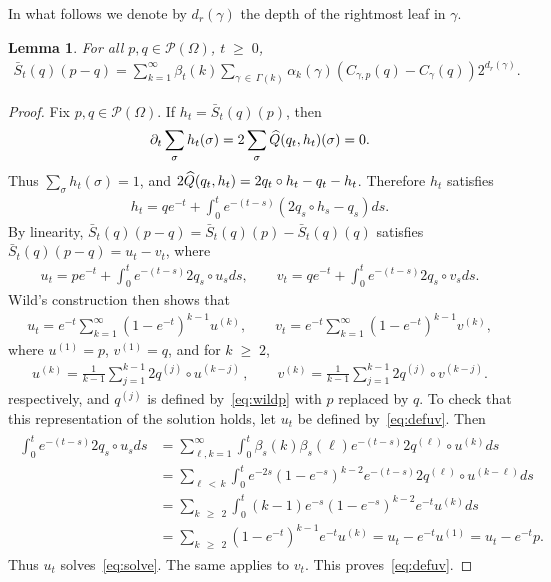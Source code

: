 \documentclass[10pt,a4paper]{article}
\newtheorem{lemm}[theorem]{Lemma}
\renewcommand{\geq}{\;\geqslant\;}
\newcommand{\si}{\sigma}
\newcommand{\cP}{\mathcal{P}}
\let\b=\beta
\let\g=\gamma
\let\O=\Omega
\let\oldhat\hat
\renewcommand*{\hat}[1]{\mathchoice{\widehat{#1}}{\widehat{#1}}{\oldhat{#1}}{\oldhat{#1}}}
\begin{document}
In what follows we denote by $d_r(\g)$ the depth of the rightmost leaf in $\g$.

\begin{lemm}\label{lem:wildrep}
For all $p,q \in \cP(\O)$, $t\geq 0$,
\begin{align}\label{eq:topid}
\bar{S}_t(q)(p-q) = \sum_{k=1}^\infty\b_t(k) \sum_{\gamma\,\in\,\Gamma(k)}\alpha_k(\gamma)\left(C_{\gamma, p}(q)-C_{\gamma}(q)\right)2^{d_r(\gamma)}.
\end{align}
\end{lemm}

\begin{proof}
Fix $p,q \in \cP(\O)$. If $h_t=\bar{S}_t(q)(p)$, then
\begin{align*}
\partial_t \sum_{\sigma}h_t(\sigma) = 2\sum_{\sigma}\hat{Q}(q_t,h_t)(\si) = 0.
\end{align*}
Thus $ \sum_{\sigma}h_t(\sigma) = 1$, and $2\hat{Q}(q_t,h_{t})=2q_t \circ h_{t} - q_t - h_{t}$. Therefore $h_t$ satisfies
\begin{align}
h_t = qe^{-t} + \int_{0}^te^{-(t-s)}\left(2q_{s} \circ h_{s}-q_{s}\right)ds.
\end{align}
By linearity, $ \bar{S}_t(q)(p-q) =\bar{S}_t(q)(p) - \bar{S}_t(q)(q)$ satisfies $\bar{S}_t(q)(p-q) =u_t-v_t$, where
\begin{align}\label{eq:solve}
u_t = pe^{-t} + \int_{0}^te^{-(t-s)}2q_{s} \circ u_{s}ds,\qquad v_t = qe^{-t} + \int_{0}^te^{-(t-s)}2q_{s} \circ v_{s}ds.
\end{align}
Wild's construction then shows that
\begin{align}\label{eq:defuv}
u_t = e^{-t}\sum_{k=1}^{\infty}\left(1-e^{-t}\right)^{k-1}u^{(k)},\qquad v_t = e^{-t}\sum_{k=1}^{\infty}\left(1-e^{-t}\right)^{k-1}v^{(k)},
\end{align}
where $u^{(1)}= p$, $v^{(1)}= q$, and for $k\geq 2$,
\begin{align*}
u^{(k)}= \frac{1}{k-1}\sum_{j=1}^{k-1}2q^{(j)}\circ u^{(k-j)} \,,\qquad v^{(k)}= \frac{1}{k-1}\sum_{j=1}^{k-1}2q^{(j)}\circ v^{(k-j)}.
\end{align*}
respectively, and $q^{(j)}$ is defined by~\eqref{eq:wildp} with $p$ replaced by $q$. To check that this representation of the solution holds, let $u_t$ be defined by~\eqref{eq:defuv}. Then
\begin{align}\label{eq:defuv1}
\begin{split}
\int_{0}^te^{-(t-s)}2q_{s} \circ u_{s}ds &= \sum_{\ell,k=1}^{\infty}
\int_{0}^t\b_s(k)\b_s(\ell)e^{-(t-s)}2q^{(\ell)} \circ u^{(k)}ds\\
& =\sum_{\ell\,<\,k}
\int_{0}^te^{-2s}\left(1-e^{-s}\right)^{k-2}e^{-(t-s)}2q^{(\ell)} \circ u^{(k-\ell)}ds\\
& =\sum_{k\,\geq\,2}
\int_{0}^t(k-1)e^{-s}\left(1-e^{-s}\right)^{k-2}e^{-t} u^{(k)}ds \\
& =\sum_{k\,\geq\,2} \left(1-e^{-t}\right)^{k-1}e^{-t} u^{(k)} = u_t - e^{-t} u^{(1)} = u_t - e^{-t} p.
\end{split}
\end{align}
Thus $u_t$ solves~\eqref{eq:solve}. The same applies to $v_t$. This proves~\eqref{eq:defuv}.


\end{proof}
\end{document}
